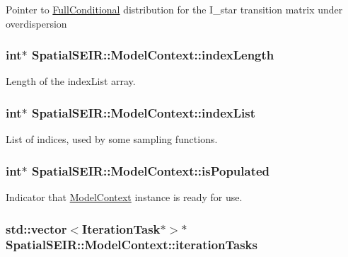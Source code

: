 Pointer to \hyperlink{classSpatialSEIR_1_1FullConditional}{Full\-Conditional} distribution for the I\-\_\-star transition matrix under overdispersion \hypertarget{classSpatialSEIR_1_1ModelContext_a451632183a787d4aab8bc53c745bea40}{
\subsubsection[{index\-Length}]{\setlength{\rightskip}{0pt plus 5cm}int$\ast$ Spatial\-S\-E\-I\-R\-::\-Model\-Context\-::index\-Length}}\label{classSpatialSEIR_1_1ModelContext_a451632183a787d4aab8bc53c745bea40}
Length of the index\-List array. \hypertarget{classSpatialSEIR_1_1ModelContext_a9813501d8b6ac165b9676947f7835473}{
\subsubsection[{index\-List}]{\setlength{\rightskip}{0pt plus 5cm}int$\ast$ Spatial\-S\-E\-I\-R\-::\-Model\-Context\-::index\-List}}\label{classSpatialSEIR_1_1ModelContext_a9813501d8b6ac165b9676947f7835473}
List of indices, used by some sampling functions. \hypertarget{classSpatialSEIR_1_1ModelContext_a698a8889db239e919323d764775a2148}{
\subsubsection[{is\-Populated}]{\setlength{\rightskip}{0pt plus 5cm}int$\ast$ Spatial\-S\-E\-I\-R\-::\-Model\-Context\-::is\-Populated}}\label{classSpatialSEIR_1_1ModelContext_a698a8889db239e919323d764775a2148}
Indicator that \hyperlink{classSpatialSEIR_1_1ModelContext}{Model\-Context} instance is ready for use. \hypertarget{classSpatialSEIR_1_1ModelContext_a681f80cc35dd7a8bf8784710a9175d47}{
\subsubsection[{iteration\-Tasks}]{\setlength{\rightskip}{0pt plus 5cm}std\-::vector$<${\bf Iteration\-Task}$\ast$$>$$\ast$ Spatial\-S\-E\-I\-R\-::\-Model\-Context\-::iteration\-Tasks}}\label{classSpatialSEIR_1_1ModelContext_a681f80cc35dd7a8bf8784710a9175d47}
